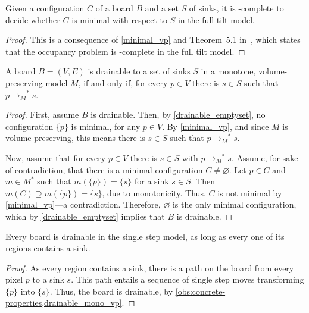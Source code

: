 \documentclass[a4paper,UKenglish,cleveref,thm-restate]{lipics-v2021}
\newcommand{\rOne}[1][M]{\ensuremath{\rightarrow_{#1}}}
\newcommand{\rStar}[1][M]{\rOne[#1]^*}
\begin{document}
\begin{proposition}
    \label{prop:minimality-hard-ft}
    Given a configuration $C$ of a board $B$ and a set $S$ of sinks, it
    is \PSPACE-complete to decide whether $C$ is minimal with respect to $S$ in the
    full tilt model.
\end{proposition}
\begin{proof}
    This is a consequence of \cref{minimal_vp} and Theorem~5.1 in~\cite{hierarchical2020}, which states that the occupancy problem is \PSPACE-complete in the full tilt model.
\end{proof}

\begin{theorem}\label{drainable_mono_vp}
A board $B=(V,E)$ is drainable to a set of sinks $S$ in a monotone,
volume-preserving model $M$, if and only if, for every $p \in V$ there is \(s \in
S\) such that $p \rStar s$.
\end{theorem}
\begin{proof}
First, assume $B$ is drainable. Then, by \cref{drainable_emptyset}, no
configuration $\{p\}$ is minimal, for any $p \in V$. By \cref{minimal_vp}, and
since $M$ is volume-preserving, this means there is $s \in S$ such that \(p
\rStar s\).

Now, assume that for every $p \in V$ there is $s \in S$ with $p \rStar
s$. Assume, for sake of contradiction, that there is a minimal configuration \(C
\neq \varnothing\). Let $p \in C$ and $m \in M^*$ such that $m(\{p\}) = \{s\}$
for a sink $s \in S$. Then \(m(C) \supseteq m(\{p\}) = \{s\}\), due to
monotonicity. Thus, $C$ is not minimal by \cref{minimal_vp}---a
contradiction. Therefore, $\varnothing$ is the only minimal configuration, which
by \cref{drainable_emptyset} implies that $B$ is drainable.
\end{proof}

\begin{observation}\label{single_step_trivial}
Every board is drainable in the single step model, as long as every one of its
regions contains a sink.
\end{observation}
\begin{proof}
As every region contains a sink, there is a path on the board from every pixel
$p$ to a sink $s$. This path entails a sequence of single step moves
transforming $\{p\}$ into $\{s\}$. Thus, the board is drainable, by
\cref{obs:concrete-properties,drainable_mono_vp}.
\end{proof}
\end{document}
